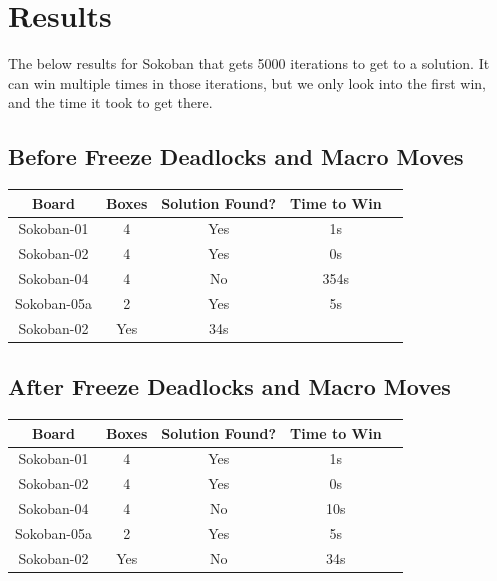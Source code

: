 \documentclass{article}
\begin{document}
\section{Results}
The below results for Sokoban that gets 5000 iterations to get to a solution. It can win multiple times in those iterations, but we only look into the first win, and the time it took to get there. 

\subsection{Before Freeze Deadlocks and Macro Moves}
\begin{center}
\vspace{-5pt}
\footnotesize
\begin{tabular}{|c|c|c|c|c|}
    \hline
    Board & Boxes & Solution Found? & Time to Win\\
    \hline
    Sokoban-01 & 4 & Yes & 1s\\
    \hline
    Sokoban-02 & 4 & Yes & 0s\\
    \hline
    Sokoban-04 & 4 & No & 354s \\
    \hline
    Sokoban-05a & 2 & Yes & 5s\\
    \hline
    Sokoban-02 & Yes & 34s\\
    \hline
\end{tabular}
\vspace{-5pt}
\end{center}

\subsection{After Freeze Deadlocks and Macro Moves}
\begin{center}
\vspace{-5pt}
\footnotesize
\begin{tabular}{|c|c|c|c|c|}
    \hline
    Board & Boxes & Solution Found? & Time to Win\\
    \hline
    Sokoban-01 & 4 & Yes & 1s\\
    \hline
    Sokoban-02 & 4 & Yes & 0s\\
    \hline
    Sokoban-04 & 4 & No & 10s \\
    \hline
    Sokoban-05a & 2 & Yes & 5s\\
    \hline
    Sokoban-02 & Yes & No & 34s\\
    \hline
\end{tabular}
\vspace{-5pt}
\end{center}
\end{document}
